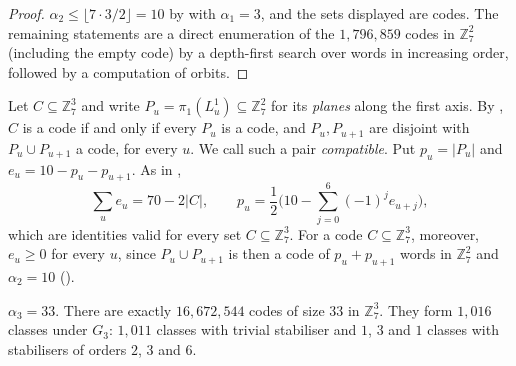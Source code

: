 \documentclass[11pt,colorlinks]{charlie}
\newcommand{\Zs}{\mathbb{Z}_7}
\begin{document}
\begin{proof}
$\alpha_2\le\lfloor7\cdot3/2\rfloor=10$ by  with $\alpha_1=3$, and the sets displayed are codes. The remaining statements are a direct enumeration of the $1{,}796{,}859$ codes in $\Zs^2$ (including the empty code) by a depth-first search over words in increasing order, followed by a computation of orbits.
\end{proof}

Let $C\subseteq\Zs^3$ and write $P_u=\pi_1(L^1_u)\subseteq\Zs^2$ for its \emph{planes} along the first axis. By , $C$ is a code if and only if every $P_u$ is a code, and $P_u,P_{u+1}$ are disjoint with $P_u\cup P_{u+1}$ a code, for every $u$. We call such a pair \emph{compatible}. Put $p_u=|P_u|$ and $e_u=10-p_u-p_{u+1}$. As in ,
\begin{equation}\label{eq:slab}
 \sum_ue_u=70-2|C|,\qquad p_u=\frac12\Big(10-\sum_{j=0}^6(-1)^je_{u+j}\Big),
\end{equation}
which are identities valid for every set $C\subseteq\Zs^3$. For a code $C\subseteq\Zs^3$, moreover, $e_u\ge0$ for every $u$, since $P_u\cup P_{u+1}$ is then a code of $p_u+p_{u+1}$ words in $\Zs^2$ and $\alpha_2=10$ ().

\begin{theorem}\label{thm:atlas}
$\alpha_3=33$. There are exactly $16{,}672{,}544$ codes of size $33$ in $\Zs^3$. They form $1{,}016$ classes under $G_3$: $1{,}011$ classes with trivial stabiliser and $1$, $3$ and $1$ classes with stabilisers of orders $2$, $3$ and $6$.
\end{theorem}
\end{document}

